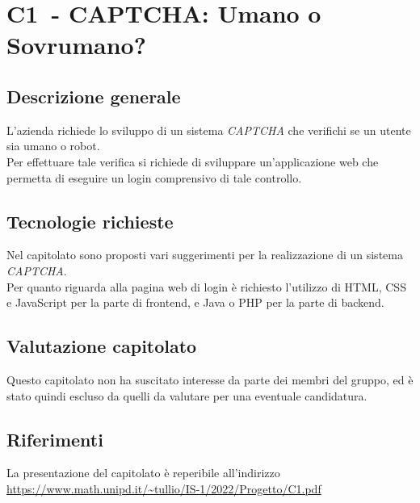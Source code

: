 
\renewcommand{\capName}{CAPTCHA: Umano o Sovrumano?} %
\renewcommand{\capCode}{C1} %
\renewcommand{\capLink}{https://www.math.unipd.it/~tullio/IS-1/2022/Progetto/C1.pdf} %
\renewcommand{\capProposer}{Zucchetti} %


\section{\capCode\ - \capName}
\subsection{Descrizione generale}
L'azienda richiede lo sviluppo di un sistema \emph{CAPTCHA} che verifichi se un utente sia umano o robot. \\
Per effettuare tale verifica si richiede di sviluppare un'applicazione web che permetta di eseguire un login comprensivo di tale controllo.

\subsection{Tecnologie richieste}
Nel capitolato sono proposti vari suggerimenti per la realizzazione di un sistema \emph{CAPTCHA}. \\
Per quanto riguarda alla pagina web di login è richiesto l'utilizzo di HTML, CSS e JavaScript per la parte di frontend, e Java o PHP per la parte di backend.

\subsection{Valutazione capitolato}
Questo capitolato non ha suscitato interesse da parte dei membri del gruppo, ed è stato quindi escluso da quelli da valutare per una eventuale candidatura.

\subsection{Riferimenti}
La presentazione del capitolato è reperibile all'indirizzo \url{\capLink}